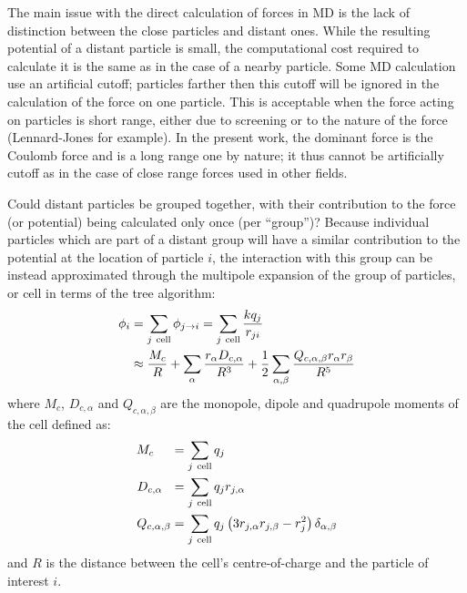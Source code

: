 The main issue with the direct calculation of forces in MD is the lack of
distinction between the close particles and distant ones. While the resulting
potential of a distant particle is small, the computational cost required to
calculate it is the same as in the case of a nearby particle. Some MD
calculation use an artificial cutoff; particles farther then this cutoff will
be ignored in the calculation of the force on one particle. This is acceptable
when the force acting on particles is short range, either due to screening or
to the nature of the force (Lennard-Jones for example).
In the present work, the dominant force is the
Coulomb force and is a long range one by nature; it thus cannot be artificially
cutoff as in the case of close range forces used in other fields.

Could distant particles be grouped together, with their contribution to the
force (or potential) being calculated only once (per ``group'')? Because
individual particles which are part of a distant group will have a similar
contribution to the potential at the location of particle $i$, the interaction
with this group can be instead approximated through the multipole
expansion\cite{Gibbon2002} of the group of particles, or cell in terms of the
tree algorithm:
\begin{align}
\phi_i & = \sum_{j~\textrm{cell}} \phi_{j \rightarrow i} = \sum_{j~{\rm cell}}
\frac{k q_j}{r_{ji}} \\
& \approx \frac{M_{c}}{R}
+ \sum_{\alpha} \frac{r_{\alpha} D_{c,\alpha}}{R^3}
+ \frac{1}{2} \sum_{\alpha,\beta} \frac{
        Q_{c,\alpha,\beta} r_{\alpha} r_{\beta}
    }{R^5}
\end{align}
where $M_{c}$, $D_{c,\alpha}$ and $Q_{c,\alpha,\beta}$ are the monopole, dipole
and quadrupole moments of the cell defined as:
\begin{subequations}
\begin{align}
M_{c}           ~~~~& = \sum_{j~\textrm{cell}} q_{j} \\
D_{c,\alpha}      ~~& = \sum_{j~\textrm{cell}} q_{j} r_{j,\alpha} \\
Q_{c,\alpha,\beta}  & = \sum_{j~\textrm{cell}} q_{j} \left( 3 r_{j,\alpha}
r_{j,\beta} - r_{j}^2 \right) \delta_{\alpha,\beta}
\end{align}
\label{eqn:tree:moments}
\end{subequations}
and $R$ is the distance between the cell's centre-of-charge and the
particle of interest $i$.

